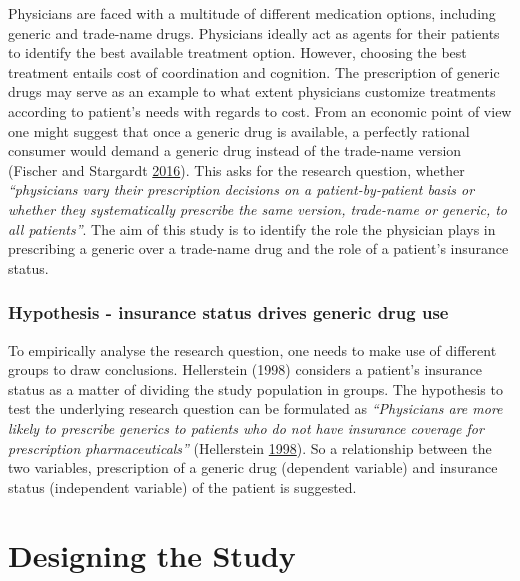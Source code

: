 \documentclass[
]{book}
\begin{document}
Physicians are faced with a multitude of different medication options,
including generic and trade-name drugs. Physicians ideally act as agents
for their patients to identify the best available treatment option.
However, choosing the best treatment entails cost of coordination and
cognition. The prescription of generic drugs may serve as an example to
what extent physicians customize treatments according to patient's needs
with regards to cost. From an economic point of view one might suggest
that once a generic drug is available, a perfectly rational consumer
would demand a generic drug instead of the trade-name version (Fischer
and Stargardt \protect\hyperlink{ref-fischer_diffusion_2016}{2016}).
This asks for the research question, whether \emph{``physicians vary
their prescription decisions on a patient-by-patient basis or whether
they systematically prescribe the same version, trade-name or generic,
to all patients''}. The aim of this study is to identify the role the
physician plays in prescribing a generic over a trade-name drug and the
role of a patient's insurance status.

\hypertarget{hypothesis---insurance-status-drives-generic-drug-use}{%
\subsection{\texorpdfstring{\textbf{Hypothesis - insurance status drives
generic drug
use}}{Hypothesis - insurance status drives generic drug use}}\label{hypothesis---insurance-status-drives-generic-drug-use}}

To empirically analyse the research question, one needs to make use of
different groups to draw conclusions. Hellerstein (1998) considers a
patient's insurance status as a matter of dividing the study population
in groups. The hypothesis to test the underlying research question can
be formulated as \emph{``Physicians are more likely to prescribe
generics to patients who do not have insurance coverage for prescription
pharmaceuticals''} (Hellerstein
\protect\hyperlink{ref-hellerstein_importance_1998}{1998}). So a
relationship between the two variables, prescription of a generic drug
(dependent variable) and insurance status (independent variable) of the
patient is suggested.

\hypertarget{designstudy}{%
\chapter{Designing the Study}\label{designstudy}}
\end{document}
